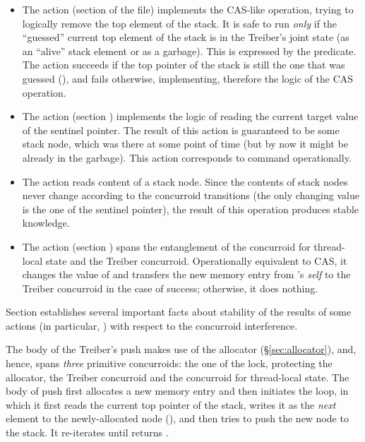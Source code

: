 \begin{itemize}
\item The  action (section  of the file)
  implements the CAS-like operation, trying to logically remove the
  top element of the stack. It is safe to run \emph{only} if the
  ``guessed'' current top element of the stack is in the Treiber's
  joint state (as an ``alive'' stack element or as a garbage). This is
  expressed by the  predicate. The action succeeds
  if the top pointer of the stack is still the one that was guessed
  (), and fails otherwise, implementing, therefore the logic
  of the CAS operation.

\item The  action (section )
  implements the logic of reading the current target value of the
  sentinel pointer. The result of this action is guaranteed to be some
  stack node, which was there at some point of time (but by now it
  might be already in the garbage). This action corresponds to
   command operationally.

\item The  action reads content of a stack node. Since
  the contents of stack nodes never change according to the concurroid
  transitions (the only changing value is the one of the sentinel
  pointer), the result of this operation produces stable knowledge.

\item The  action (section ) spans the
  entanglement of the concurroid  for thread-local state
  and the Treiber concurroid. Operationally equivalent to CAS, it
  changes the value of  and transfers the new memory entry
  from 's \emph{self} to the Treiber concurroid in the case
  of success; otherwise, it does nothing.

\end{itemize}

Section  establishes several important facts about
stability of the results of some actions (in particular,
) with respect to the concurroid interference.

The body of the Treiber's push makes use of the allocator
(\S\ref{sec:allocator}), and, hence, spans \emph{three} primitive
concurroids: the one of the lock, protecting the allocator, the
Treiber concurroid and the concurroid for thread-local state. The body
of push first allocates a new memory entry and then initiates the
loop, in which it first reads the current top pointer  of the
stack, writes it as the \emph{next} element to the newly-allocated
node (), and then tries to push the
new node to the stack. It re-iterates until 
returns .


